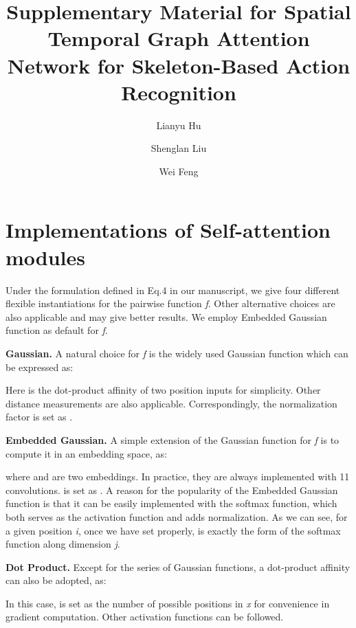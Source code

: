 \documentclass[runningheads]{llncs}
\begin{document}


\appendix

\title{Supplementary Material for Spatial Temporal Graph Attention Network for Skeleton-Based Action Recognition} 


\author{Lianyu Hu \and
Shenglan Liu \and
Wei Feng}
\maketitle

\section{Implementations of Self-attention modules}
Under the formulation defined in Eq.4 in our manuscript, we give four different flexible instantiations for the pairwise function \textit{f}. Other alternative choices are also applicable and may give better results. We employ Embedded Gaussian function as default for \textit{f}.

\textbf{Gaussian.} A natural choice for \textit{f} is the widely used Gaussian function which can be expressed as:

Here  is the dot-product affinity of two position inputs for simplicity. Other distance measurements are also applicable. Correspondingly, the normalization factor  is set as .

\textbf{Embedded Gaussian.} A simple extension of the Gaussian function for \textit{f} is to compute it in an embedding space, as:

where  and  are two embeddings. In practice, they are always implemented with 11 convolutions.  is set as . A reason for the popularity of the Embedded Gaussian function is that it can be easily implemented with the softmax function, which both serves as the activation function and adds normalization. As we can see, for a given position \textit{i}, once we have set  properly,  is exactly the form of the softmax function along dimension \textit{j}.

\textbf{Dot Product.} Except for the series of Gaussian functions, a dot-product affinity can also be adopted, as:

In this case,  is set as the number of possible positions in \textit{x} for convenience in gradient computation. Other activation functions can be followed.
\end{document}
